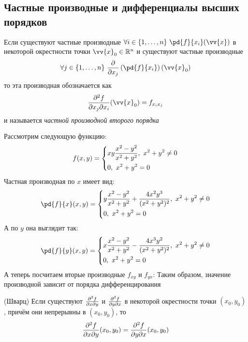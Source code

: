 \subsection{Частные производные и дифференциалы высших порядков}

\begin{definition}
	Если существуют частные производные $\forall i \in \range{n}\ \pd{f}{x_i} (\vv{x})$ в некоторой окрестности точки $\vv{x}_0 \in \R^n$ и существуют частные производные 
	\[
		\forall j \in \range{n}\ \frac{\vdelta}{\vdelta x_j} \left(\pd{f}{x_i}\right) (\vv{x}_0)
	\]
	то эта производная обозначается как
	\[
		\frac{\vdelta^2 f}{\vdelta x_j \vdelta x_i} (\vv{x}_0) = f_{x_ix_j}
	\]
	и называется \textit{частной производной второго порядка}
\end{definition}

\begin{example}
	Рассмотрим следующую функцию:
	\[
		f(x, y) = \left\{\begin{aligned}
			&{xy \frac{x^2 - y^2}{x^2 + y^2},\ x^2 + y^2 \neq 0}
			\\
			&{0,\ x^2 + y^2 = 0}
		\end{aligned}\right.
	\]
	Частная производная по $x$ имеет вид:
	\[
		\pd{f}{x} (x, y) = \System{
			&{y \frac{x^2 - y^2}{x^2 + y^2} + \frac{4x^2 y^3}{(x^2 + y^2)^2},\ x^2 + y^2 \neq 0}
			\\
			&{0,\ x^2 + y^2 = 0}
		}
	\]
	А по $y$ она выглядит так:
	\[
		\pd{f}{y} (x, y) = \System{
			&{x \frac{x^2 - y^2}{x^2 + y^2} - \frac{4x^3 y^2}{(x^2 + y^2)^2},\ x^2 + y^2 \neq 0}
			\\
			&{0,\ x^2 + y^2 = 0}
		}
	\]
	А теперь посчитаем вторые производные $f_{xy}$ и $f_{yx}$:
	Таким образом, значение производной зависит от порядка дифференцирования
\end{example}

\begin{theorem} (Шварц)
	Если существуют $\frac{\partial^2 f}{\partial x \partial y}$ и $\frac{\partial^2 f}{\partial y \partial x}$ в некоторой окрестности точки $(x_0, y_0)$, причём они непрерывны в $(x_0, y_0)$, то
	\[
		\frac{\partial^2 f}{\partial x \partial y} (x_0, y_0) = \frac{\partial^2 f}{\partial y \partial x} (x_0, y_0)
	\]
\end{theorem}

